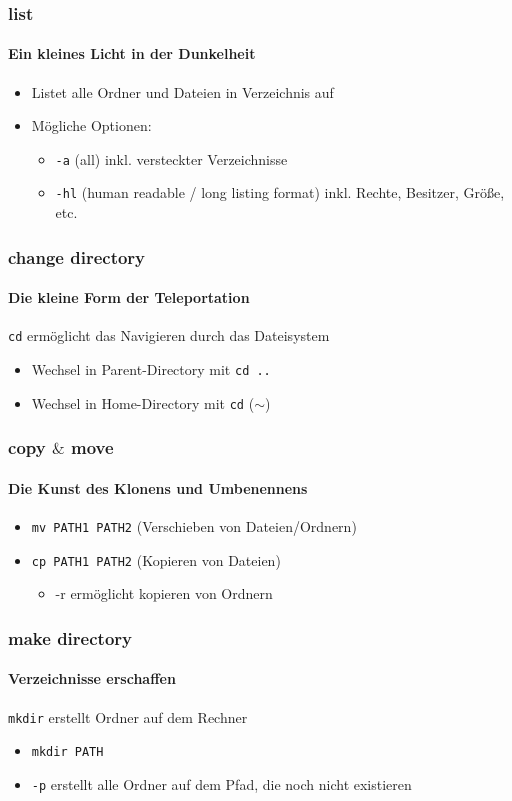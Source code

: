 \documentclass[12pt,utf8]{beamer}
\begin{document}
\begin{frame}
	\frametitle{\textcolor{FOSSAGalert}{l}i\textcolor{FOSSAGalert}{s}t}
	\framesubtitle{Ein kleines Licht in der Dunkelheit}
	\begin{itemize}
		\item Listet alle Ordner und Dateien in Verzeichnis auf
		\item Mögliche Optionen:
		\begin{itemize}[<+->]
			\item \texttt{-a}  (all) inkl. versteckter Verzeichnisse
			\item \texttt{-hl}  (human readable / long listing format) inkl. Rechte, Besitzer, Größe, etc.
		\end{itemize}
	\end{itemize}
\end{frame}

\begin{frame}
	\frametitle{\textcolor{FOSSAGalert}{c}hange \textcolor{FOSSAGalert}{d}irectory}
	\framesubtitle{Die kleine Form der Teleportation}
	\texttt{cd} ermöglicht das Navigieren durch das Dateisystem
	\begin{itemize}
		\item Wechsel in Parent-Directory mit \texttt{cd ..}
		\item Wechsel in Home-Directory mit \texttt{cd} ($\sim$)
	\end{itemize}
\end{frame}

\begin{frame}
\frametitle{\textcolor{FOSSAGalert}{c}o\textcolor{FOSSAGalert}{p}y $\&$ \textcolor{FOSSAGalert}{m}o\textcolor{FOSSAGalert}{v}e}
\framesubtitle{Die Kunst des Klonens und Umbenennens}
\begin{itemize}
	\item \texttt{mv PATH1 PATH2} (Verschieben von Dateien/Ordnern)
	\item \texttt{cp PATH1 PATH2} (Kopieren von Dateien)
	\begin{itemize}
		\item -r ermöglicht kopieren von Ordnern
	\end{itemize}
\end{itemize}
\end{frame}

\begin{frame}
\frametitle{\textcolor{FOSSAGalert}{m}a\textcolor{FOSSAGalert}{k}e \textcolor{FOSSAGalert}{dir}ectory}
\framesubtitle{Verzeichnisse erschaffen}
\texttt{mkdir} erstellt Ordner auf dem Rechner
\begin{itemize}
	\item \texttt{mkdir PATH}
	\item \texttt{-p} erstellt alle Ordner auf dem Pfad, die noch nicht existieren
\end{itemize}
\end{frame}
\end{document}

